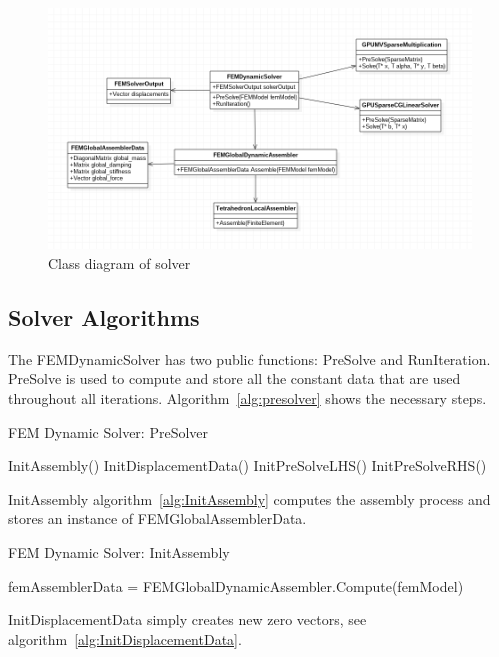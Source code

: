 \documentclass[en]{minipw} %
\begin{document}
\begin{figure}[h!]
\centering
\includegraphics[scale=0.5]{pictures/solver.png}
\caption[Class diagram of solver]{Class diagram of solver}
\label{fig:uml_solver}
\end{figure}

\subsection{Solver Algorithms}
The FEMDynamicSolver has two public functions: PreSolve and RunIteration. PreSolve is used to compute and store all the constant data that are used throughout all iterations. Algorithm~\ref{alg:presolver} shows the necessary steps.

\begin{algorithm}
\caption{FEM Dynamic Solver: PreSolver}
\label{alg:presolver}
\begin{algorithmic}[1]
\State InitAssembly()
\State InitDisplacementData()
\State InitPreSolveLHS()
\State InitPreSolveRHS()
\EndProcedure
\end{algorithmic}
\end{algorithm}

InitAssembly algorithm~\ref{alg:InitAssembly} computes the assembly process and stores an instance of FEMGlobalAssemblerData.

\begin{algorithm}
\caption{FEM Dynamic Solver: InitAssembly}
\label{alg:InitAssembly}
\begin{algorithmic}[1]
\State femAssemblerData = FEMGlobalDynamicAssembler.Compute(femModel)
\EndProcedure
\end{algorithmic}
\end{algorithm}

InitDisplacementData simply creates new zero vectors, see algorithm~\ref{alg:InitDisplacementData}.
 
\end{document}
